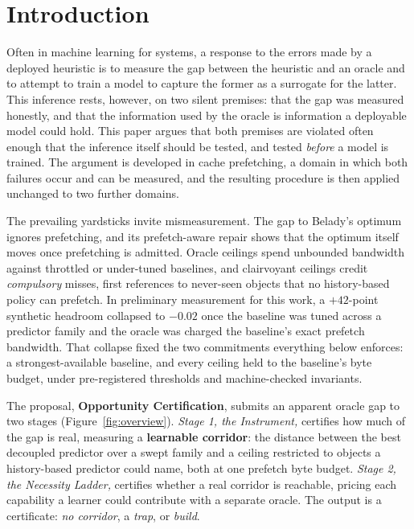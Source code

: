 \documentclass[letterpaper]{article} %
\begin{document}
\section{Introduction}
Often in machine learning for systems, a response to the errors made by a deployed heuristic is to measure the gap between the heuristic and an oracle and to attempt to train a model to capture the former as a surrogate for the latter. This inference rests, however, on two silent premises: that the gap was measured honestly, and that the information used by the oracle is information a deployable model could hold. This paper argues that both premises are violated often enough that the inference itself should be tested, and tested \emph{before} a model is trained. The argument is developed in cache prefetching, a domain in which both failures occur and can be measured, and the resulting procedure is then applied unchanged to two further domains.

The prevailing yardsticks invite mismeasurement. The gap to Belady's optimum \citep{belady} ignores prefetching, and its prefetch-aware repair \citep{demandmin} shows that the optimum itself moves once prefetching is admitted. Oracle ceilings spend unbounded bandwidth against throttled or under-tuned baselines, and clairvoyant ceilings credit \emph{compulsory} misses, first references to never-seen objects that no history-based policy can prefetch. In preliminary measurement for this work, a $+42$-point synthetic headroom collapsed to $-0.02$ once the baseline was tuned across a predictor family and the oracle was charged the baseline's exact prefetch bandwidth. That collapse fixed the two commitments everything below enforces: a strongest-available baseline, and every ceiling held to the baseline's byte budget, under pre-registered thresholds and machine-checked invariants.

The proposal, \textbf{Opportunity Certification}, submits an apparent oracle gap to two stages (Figure~\ref{fig:overview}). \emph{Stage 1, the Instrument,} certifies how much of the gap is real, measuring a \textbf{learnable corridor}: the distance between the best decoupled predictor over a swept family and a ceiling restricted to objects a history-based predictor could name, both at one prefetch byte budget. \emph{Stage 2, the Necessity Ladder,} certifies whether a real corridor is reachable, pricing each capability a learner could contribute with a separate oracle. The output is a certificate: \emph{no corridor}, a \emph{trap}, or \emph{build}.
\end{document}
